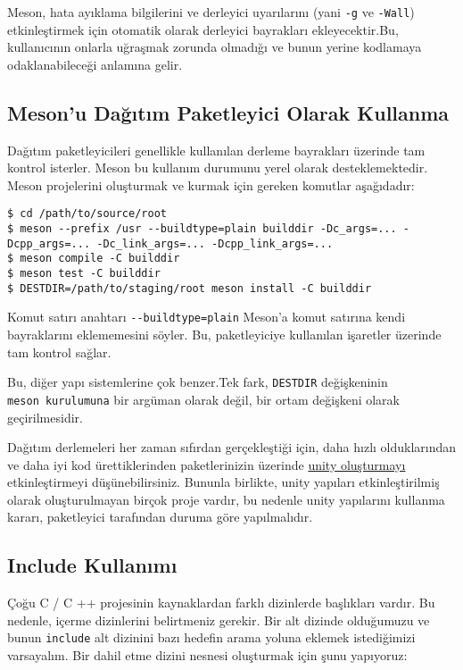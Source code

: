 \documentclass[
]{book}
\begin{document}
Meson, hata ayıklama bilgilerini ve derleyici uyarılarını (yani \texttt{-g} ve \texttt{-Wall}) etkinleştirmek için otomatik olarak derleyici bayrakları ekleyecektir.Bu, kullanıcının onlarla uğraşmak zorunda olmadığı ve bunun yerine kodlamaya odaklanabileceği anlamına gelir.

\hypertarget{mesonu-daux11fux131tux131m-paketleyici-olarak-kullanma}{%
\subsection{Meson'u Dağıtım Paketleyici Olarak Kullanma}\label{mesonu-daux11fux131tux131m-paketleyici-olarak-kullanma}}

Dağıtım paketleyicileri genellikle kullanılan derleme bayrakları üzerinde tam kontrol isterler. Meson bu kullanım durumunu yerel olarak desteklemektedir. Meson projelerini oluşturmak ve kurmak için gereken komutlar aşağıdadır:

\begin{verbatim}
$ cd /path/to/source/root
$ meson --prefix /usr --buildtype=plain builddir -Dc_args=... -Dcpp_args=... -Dc_link_args=... -Dcpp_link_args=...
$ meson compile -C builddir
$ meson test -C builddir
$ DESTDIR=/path/to/staging/root meson install -C builddir
\end{verbatim}

Komut satırı anahtarı \texttt{-\/-buildtype=plain} Meson'a komut satırına kendi bayraklarını eklememesini söyler. Bu, paketleyiciye kullanılan işaretler üzerinde tam kontrol sağlar.

Bu, diğer yapı sistemlerine çok benzer.Tek fark, \texttt{DESTDIR} değişkeninin \texttt{meson\ kurulumuna} bir argüman olarak değil, bir ortam değişkeni olarak geçirilmesidir.

Dağıtım derlemeleri her zaman sıfırdan gerçekleştiği için, daha hızlı olduklarından ve daha iyi kod ürettiklerinden paketlerinizin üzerinde \href{https://mesonbuild.com/Unity-builds.html}{unity oluşturmayı} etkinleştirmeyi düşünebilirsiniz. Bununla birlikte, unity yapıları etkinleştirilmiş olarak oluşturulmayan birçok proje vardır, bu nedenle unity yapılarını kullanma kararı, paketleyici tarafından duruma göre yapılmalıdır.

\hypertarget{include-kullanux131mux131}{%
\subsection{Include Kullanımı}\label{include-kullanux131mux131}}

Çoğu C / C ++ projesinin kaynaklardan farklı dizinlerde başlıkları vardır. Bu nedenle, içerme dizinlerini belirtmeniz gerekir. Bir alt dizinde olduğumuzu ve bunun \texttt{include} alt dizinini bazı hedefin arama yoluna eklemek istediğimizi varsayalım. Bir dahil etme dizini nesnesi oluşturmak için şunu yapıyoruz:
\end{document}
